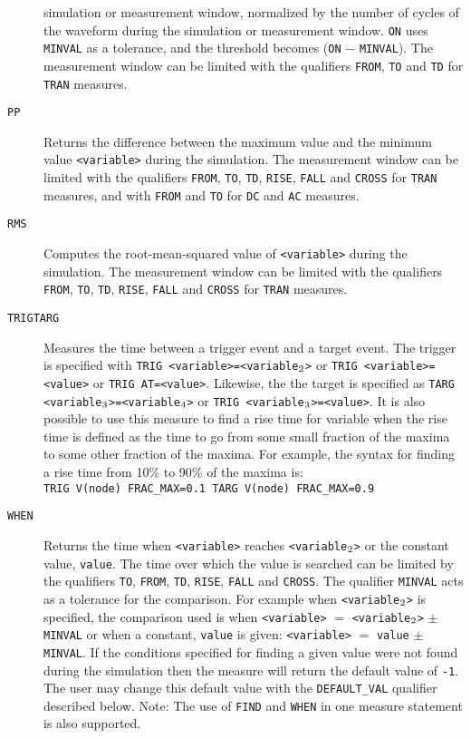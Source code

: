 \begin{Command}
\begin{Arguments}
\begin{description}
    simulation or measurement window, normalized by the number of cycles of the waveform 
    during the simulation or measurement window.  {\tt ON} uses {\tt MINVAL} as a tolerance, 
    and the threshold becomes ({\tt ON} $-$ {\tt MINVAL}).  The measurement window can be limited
    with the qualifiers {\tt FROM}, {\tt TO} and {\tt TD} for {\tt TRAN} measures.
  \item[\tt PP] Returns the difference between the maximum value and the minimum value
    {\tt <variable>} during the simulation. The measurement window can be limited with 
    the qualifiers {\tt FROM}, {\tt TO}, {\tt TD}, {\tt RISE}, {\tt FALL} and {\tt CROSS}
    for {\tt TRAN} measures, and with {\tt FROM} and {\tt TO} for {\tt DC} and {\tt AC} measures. 
  \item[\tt RMS] Computes the root-mean-squared value of {\tt <variable>} during the
    simulation.  The measurement window can be limited with the qualifiers {\tt FROM}, 
    {\tt TO}, {\tt TD}, {\tt RISE}, {\tt FALL} and {\tt CROSS} for {\tt TRAN} measures. 
  \item[\vbox{\hbox{\tt TRIG\hfil}\hbox{\tt TARG\hfil}}] Measures the
    time between a trigger event and a target event.  The trigger is
    specified with {\tt TRIG <variable>=<variable\(\sb{2}\)>} or 
    {\tt TRIG <variable>=<value>} or {\tt TRIG AT=<value>}.  Likewise, the the 
    target is specified as {\tt TARG <variable\(\sb{3}\)>=<variable\(\sb{4}\)>} or 
    {\tt TRIG <variable\(\sb{3}\)>=<value>}.  It is also possible to use
    this measure to find a rise time for variable when the rise time is
    defined as the time to go from some small fraction of the maxima to
    some other fraction of the maxima.  For example, the syntax for finding
    a rise time from 10\% to 90\% of the maxima is:\\
    \texttt{TRIG V(node) FRAC\_MAX=0.1 TARG V(node) FRAC\_MAX=0.9}
  \item[\tt WHEN] Returns the time when {\tt <variable>} reaches {\tt <variable\(\sb{2}\)>} or
    the constant value, {\tt value}.  The time over which the value is searched
    can be limited by the qualifiers {\tt TO}, {\tt FROM}, {\tt TD}, {\tt RISE}, {\tt FALL} and {\tt CROSS}.
    The qualifier {\tt MINVAL} acts as a tolerance for the comparison.  
    For example when {\tt <variable\(\sb{2}\)>} is
    specified, the comparison used is when {\tt <variable>} $=$ {\tt <variable\(\sb{2}\)>} $\pm$ {\tt MINVAL}
    or when a constant, {\tt value} is given: {\tt <variable>} $=$ {\tt value} $\pm$ {\tt MINVAL}.
    If the conditions specified for finding a given value were not found during the simulation then
    the measure will return the default value of {\tt -1}.  The user may change this default value with
    the {\tt DEFAULT\_VAL} qualifier described below.  Note: The use of {\tt FIND} and {\tt WHEN} 
    in one measure statement is also supported.
\end{description}


\end{Arguments}
\end{Command}
